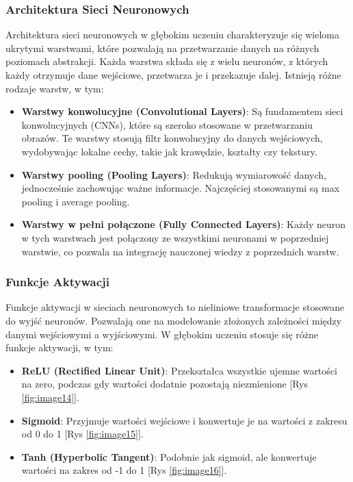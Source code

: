 \subsubsection*{Architektura Sieci Neuronowych}
Architektura sieci neuronowych w głębokim uczeniu charakteryzuje się wieloma ukrytymi warstwami, które pozwalają na przetwarzanie danych na różnych poziomach abstrakcji. Każda warstwa składa się z wielu neuronów, z których każdy otrzymuje dane wejściowe, przetwarza je i przekazuje dalej. Istnieją różne rodzaje warstw, w tym:
\begin{itemize}
    \item \textbf{Warstwy konwolucyjne (Convolutional Layers)}: Są fundamentem sieci konwolucyjnych (CNNs), które są szeroko stosowane w przetwarzaniu obrazów. Te warstwy stosują filtr konwolucyjny do danych wejściowych, wydobywając lokalne cechy, takie jak krawędzie, kształty czy tekstury.
    \item \textbf{Warstwy pooling (Pooling Layers)}: Redukują wymiarowość danych, jednocześnie zachowując ważne informacje. Najczęściej stosowanymi są max pooling i average pooling.
    \item \textbf{Warstwy w pełni połączone (Fully Connected Layers)}: Każdy neuron w tych warstwach jest połączony ze wszystkimi neuronami w poprzedniej warstwie, co pozwala na integrację nauczonej wiedzy z poprzednich warstw.
\end{itemize}


\subsubsection*{Funkcje Aktywacji}
Funkcje aktywacji w sieciach neuronowych to nieliniowe transformacje stosowane do wyjść neuronów. Pozwalają one na modelowanie złożonych zależności między danymi wejściowymi a wyjściowymi. W głębokim uczeniu stosuje się różne funkcje aktywacji, w tym:
\begin{itemize}
    \item \textbf{ReLU (Rectified Linear Unit)}: Przekształca wszystkie ujemne wartości na zero, podczas gdy wartości dodatnie pozostają niezmienione  [Rys \ref{fig:image14}].
    \item \textbf{Sigmoid}: Przyjmuje wartości wejściowe i konwertuje je na wartości z zakresu od 0 do 1 [Rys \ref{fig:image15}].
    \item \textbf{Tanh (Hyperbolic Tangent)}: Podobnie jak sigmoid, ale konwertuje wartości na zakres od -1 do 1 [Rys \ref{fig:image16}].
\end{itemize}

